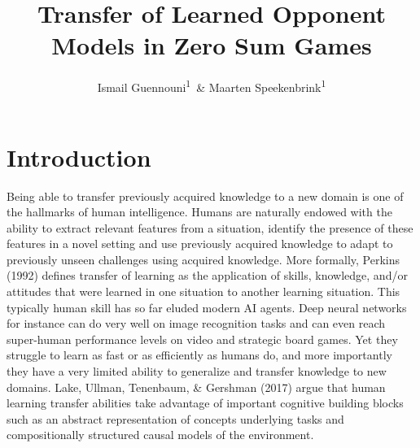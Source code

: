 \documentclass[man,floatsintext]{apa6}
\affiliation{
\vspace{0.5cm}
\textsuperscript{1} Department of Experimental Psychology, University College London}
\title{Transfer of Learned Opponent Models in Zero Sum Games}
\author{Ismail Guennouni\textsuperscript{1}~\& Maarten Speekenbrink\textsuperscript{1}}
\date{}
\begin{document}
\maketitle

\hypertarget{introduction}{%
\section{Introduction}\label{introduction}}

Being able to transfer previously acquired knowledge to a new domain is one of the hallmarks of human intelligence. Humans are naturally endowed with the ability to extract relevant features from a situation, identify the presence of these features in a novel setting and use previously acquired knowledge to adapt to previously unseen challenges using acquired knowledge. More formally, Perkins (1992) defines transfer of learning as the application of skills, knowledge, and/or attitudes that were learned in one situation to another learning situation. This typically human skill has so far eluded modern AI agents. Deep neural networks for instance can do very well on image recognition tasks and can even reach super-human performance levels on video and strategic board games. Yet they struggle to learn as fast or as efficiently as humans do, and more importantly they have a very limited ability to generalize and transfer knowledge to new domains. Lake, Ullman, Tenenbaum, \& Gershman (2017) argue that human learning transfer abilities take advantage of important cognitive building blocks such as an abstract representation of concepts underlying tasks and compositionally structured causal models of the environment.
\end{document}
